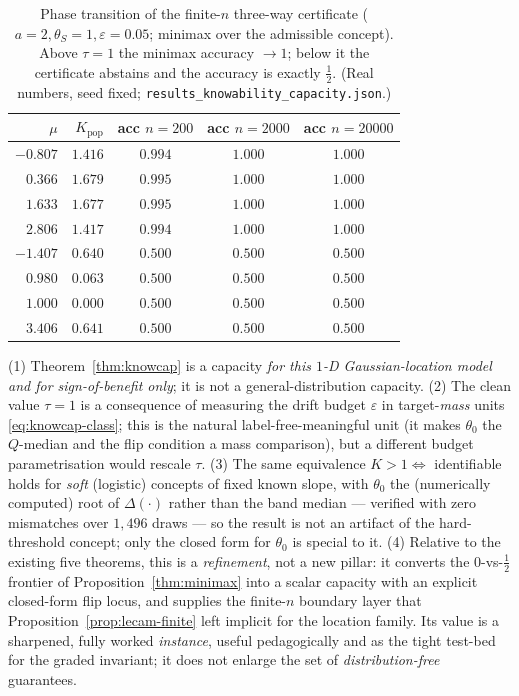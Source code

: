 \begin{table}[t]\centering\small
\begin{tabular}{rrccc}
\hline
$\mu$ & $K_{\mathrm{pop}}$ & acc $n{=}200$ & acc $n{=}2000$ & acc $n{=}20000$\\
\hline
$-0.807$ & $1.416$ & $0.994$ & $1.000$ & $1.000$\\
$\ \ 0.366$ & $1.679$ & $0.995$ & $1.000$ & $1.000$\\
$\ \ 1.633$ & $1.677$ & $0.995$ & $1.000$ & $1.000$\\
$\ \ 2.806$ & $1.417$ & $0.994$ & $1.000$ & $1.000$\\[2pt]
$-1.407$ & $0.640$ & $0.500$ & $0.500$ & $0.500$\\
$\ \ 0.980$ & $0.063$ & $0.500$ & $0.500$ & $0.500$\\
$\ \ 1.000$ & $0.000$ & $0.500$ & $0.500$ & $0.500$\\
$\ \ 3.406$ & $0.641$ & $0.500$ & $0.500$ & $0.500$\\
\hline
\end{tabular}
\caption{Phase transition of the finite-$n$ three-way certificate
($a{=}2,\theta_S{=}1,\varepsilon{=}0.05$; minimax over the admissible concept). Above
$\tau{=}1$ the minimax accuracy $\to1$; below it the certificate abstains and the
accuracy is exactly $\tfrac12$. (Real numbers, seed fixed;
\texttt{results\_knowability\_capacity.json}.)}
\label{tab:knowcap-phase}
\end{table}

\begin{remark}\label{rmk:knowcap-scope}
\textnormal{(1)} Theorem~\ref{thm:knowcap} is a capacity \emph{for this $1$-D
Gaussian-location model and for sign-of-benefit only}; it is not a
general-distribution capacity. \textnormal{(2)} The clean value $\tau=1$ is a
consequence of measuring the drift budget $\varepsilon$ in target-\emph{mass} units
\eqref{eq:knowcap-class}; this is the natural label-free-meaningful unit (it makes
$\theta_0$ the $Q$-median and the flip condition a mass comparison), but a different
budget parametrisation would rescale $\tau$. \textnormal{(3)} The same equivalence
$K>1\iff$ identifiable holds for \emph{soft} (logistic) concepts of fixed known
slope, with $\theta_0$ the (numerically computed) root of $\Delta(\cdot)$ rather than
the band median --- verified with zero mismatches over $1{,}496$ draws --- so the
result is not an artifact of the hard-threshold concept; only the closed form for
$\theta_0$ is special to it. \textnormal{(4)} Relative to the existing five
theorems, this is a \emph{refinement}, not a new pillar: it converts the
$0$-vs-$\tfrac12$ frontier of Proposition~\ref{thm:minimax} into a scalar capacity
with an explicit closed-form flip locus, and supplies the finite-$n$ boundary layer
that Proposition~\ref{prop:lecam-finite} left implicit for the location family. Its
value is a sharpened, fully worked \emph{instance}, useful pedagogically and as the
tight test-bed for the graded invariant; it does not enlarge the set of
\emph{distribution-free} guarantees.
\end{remark}
